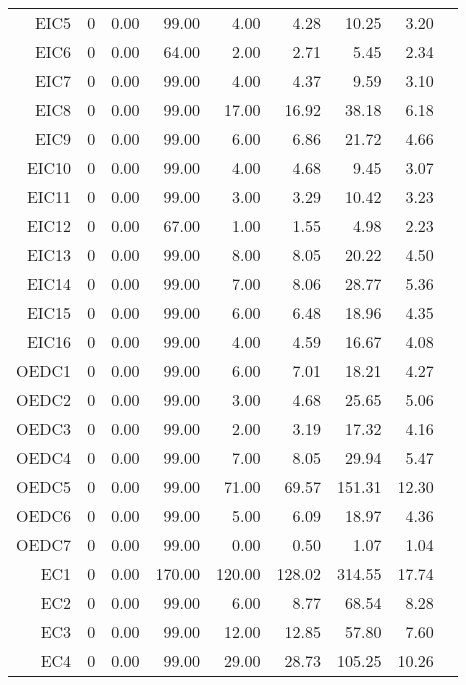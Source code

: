 \begin{longtable}{|rrrrrrrrr|}
	EIC5  &  0  &  0.00  &  99.00  &  4.00  &  4.28  &  10.25  &  3.20 & \\
	EIC6  &  0  &  0.00  &  64.00  &  2.00  &  2.71  &  5.45  &  2.34 & \\
	EIC7  &  0  &  0.00  &  99.00  &  4.00  &  4.37  &  9.59  &  3.10 & \\
	EIC8  &  0  &  0.00  &  99.00  &  17.00  &  16.92  &  38.18  &  6.18 & \\
	EIC9  &  0  &  0.00  &  99.00  &  6.00  &  6.86  &  21.72  &  4.66 & \\
	EIC10  &  0  &  0.00  &  99.00  &  4.00  &  4.68  &  9.45  &  3.07 & \\
	EIC11  &  0  &  0.00  &  99.00  &  3.00  &  3.29  &  10.42  &  3.23 & \\
	EIC12  &  0  &  0.00  &  67.00  &  1.00  &  1.55  &  4.98  &  2.23 & \\
	EIC13  &  0  &  0.00  &  99.00  &  8.00  &  8.05  &  20.22  &  4.50 & \\
	EIC14  &  0  &  0.00  &  99.00  &  7.00  &  8.06  &  28.77  &  5.36 & \\
	EIC15  &  0  &  0.00  &  99.00  &  6.00  &  6.48  &  18.96  &  4.35 & \\
	EIC16  &  0  &  0.00  &  99.00  &  4.00  &  4.59  &  16.67  &  4.08 & \\
	OEDC1  &  0  &  0.00  &  99.00  &  6.00  &  7.01  &  18.21  &  4.27 & \\
	OEDC2  &  0  &  0.00  &  99.00  &  3.00  &  4.68  &  25.65  &  5.06 & \\
	OEDC3  &  0  &  0.00  &  99.00  &  2.00  &  3.19  &  17.32  &  4.16 & \\
	OEDC4  &  0  &  0.00  &  99.00  &  7.00  &  8.05  &  29.94  &  5.47 & \\
	OEDC5  &  0  &  0.00  &  99.00  &  71.00  &  69.57  &  151.31  &  12.30 & \\
	OEDC6  &  0  &  0.00  &  99.00  &  5.00  &  6.09  &  18.97  &  4.36 & \\
	OEDC7  &  0  &  0.00  &  99.00  &  0.00  &  0.50  &  1.07  &  1.04 & \\
	EC1  &  0  &  0.00  &  170.00  &  120.00  &  128.02  &  314.55  &  17.74 & \\
	EC2  &  0  &  0.00  &  99.00  &  6.00  &  8.77  &  68.54  &  8.28 & \\
	EC3  &  0  &  0.00  &  99.00  &  12.00  &  12.85  &  57.80  &  7.60 & \\
	EC4  &  0  &  0.00  &  99.00  &  29.00  &  28.73  &  105.25  &  10.26 & \\

\end{longtable}
